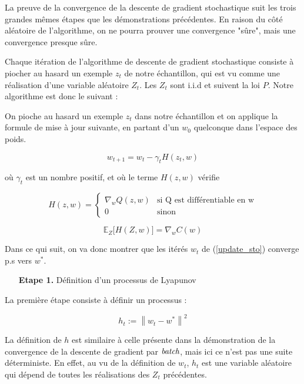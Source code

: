 \documentclass{article}
\begin{document}
La preuve de la convergence de la descente de gradient stochastique suit les trois grandes mêmes étapes que les démonstrations précédentes. En raison du côté aléatoire de l'algorithme, on ne pourra prouver une convergence "sûre", mais une convergence presque sûre.

Chaque itération de l'algorithme de descente de gradient stochastique consiste à piocher au hasard un exemple $z_t$ de notre échantillon, qui est vu comme une réalisation  d'une variable aléatoire $Z_t$. Les $Z_t$ sont i.i.d et suivent la loi $P$. Notre algorithme est donc le suivant :
\bigskip

On pioche au hasard un exemple $z_t$ dans notre échantillon et on applique la formule de mise à jour suivante, en partant d'un $w_0$ quelconque dans l'espace des poids.

\begin{equation}\label{update_sto}
w_{t+1} = w_t-\gamma_t H(z_t,w)
\end{equation}

où $\gamma_t$ est un nombre positif, et où le terme $H(z,w)$ vérifie

\begin{equation*}
H(z,w) = \left\{
\begin{array}{ll}
    \nabla_wQ(z,w) & \text{si Q est différentiable en w}  \\
    0 & \text{sinon} 
\end{array}
\right.
\end{equation*}

\begin{equation*}
    \mathbb{E}_{Z}\big[H(Z,w)\big] = \nabla_w C(w)
\end{equation*}

Dans ce qui suit, on va donc montrer que les itérés $w_t$ de (\ref{update_sto}) converge p.s vers $w^*$.
\bigskip

\begin{itemize}
    \item[\textbf{Etape 1.}] Définition d'un processus de Lyapunov
\end{itemize}
\bigskip

La première étape consiste à définir un processus : 
    
\begin{equation}\label{process_lya}
    h_t:=\left\|w_t-w^* \right\|^2
\end{equation}
    
La définition de $h$ est similaire à celle présente dans la démonstration de la convergence de la descente de gradient par $\emph{batch}$, mais ici ce n'est pas une suite déterministe. En effet, au vu de la définition de $w_t$, $h_t$ est une variable aléatoire qui dépend de toutes les réalisations des $Z_t$ précédentes.
\bigskip
\end{document}

